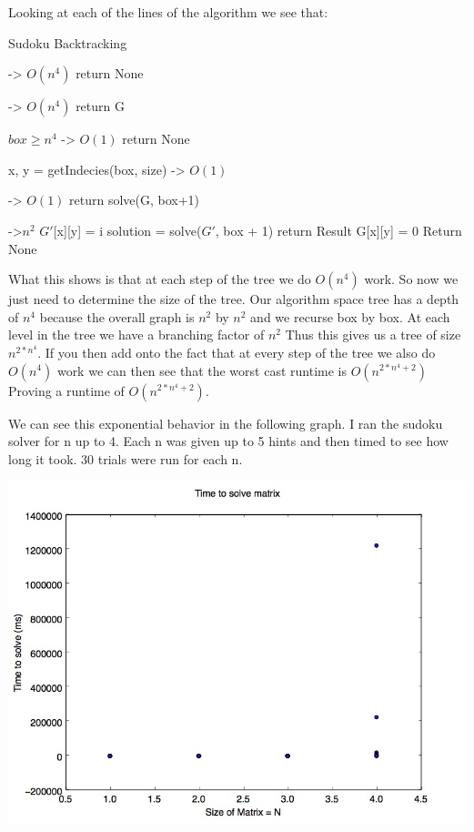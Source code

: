\documentclass{sig-alternate}
\begin{document}
Looking at each of the lines of the algorithm we see that:

\begin{algorithm}
\caption{Sudoku Backtracking}\label{solve}
\begin{algorithmic}[1]

 -> $O(n^4)$
\State return None
\EndIf

 -> $O(n^4)$
\State return G
\EndIf

\If $box \ge n^4$ -> $O(1)$
\State return None
\EndIf

\State x, y = getIndecies(box, size) -> $O(1)$

 -> $O(1)$
\State return solve(G, box+1)
\EndIf

 ->$n^2$
\State $G'$[x][y] = i
\State solution = solve($G'$, box + 1) 
\State return Result
\EndIf
\EndFor
\State G[x][y] = 0
\State Return None
\EndProcedure
\end{algorithmic}
\end{algorithm}

What this shows is that at each step of the tree we do $O(n^4)$ work. So now we just need to determine the size of the tree. Our algorithm space tree has a depth of $n^4$ because the overall graph is $n^2$ by $n^2$ and we recurse box by box. At each level in the tree we have a branching factor of $n^2$ Thus this gives us a tree of size $n^{2*n^4}$. If you then add onto the fact that at every step of the tree we also do $O(n^4)$ work we can then see that the worst cast runtime is $O(n^{2*n^4 + 2})$ Proving a runtime of $O(n^{2*n^4 + 2})$. 

We can see this exponential behavior in the following graph. I ran the sudoku solver for n up to 4. Each n was given up to 5 hints and then timed to see how long it took. 30 trials were run for each n. 

\includegraphics[]{src/allN.jpg}
\end{document}
